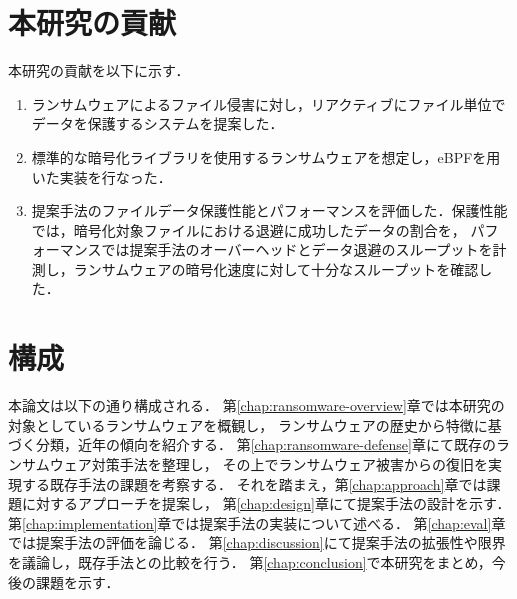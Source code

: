 \section{本研究の貢献}
本研究の貢献を以下に示す．
\begin{enumerate}
  \item ランサムウェアによるファイル侵害に対し，リアクティブにファイル単位でデータを保護するシステムを提案した．


  \item 標準的な暗号化ライブラリを使用するランサムウェアを想定し，eBPFを用いた実装を行なった．

  \item 提案手法のファイルデータ保護性能とパフォーマンスを評価した．保護性能では，暗号化対象ファイルにおける退避に成功したデータの割合を，
        パフォーマンスでは提案手法のオーバーヘッドとデータ退避のスループットを計測し，ランサムウェアの暗号化速度に対して十分なスループットを確認した．
\end{enumerate}

\section{構成}
本論文は以下の通り構成される．
第\ref{chap:ransomware-overview}章では本研究の対象としているランサムウェアを概観し，
ランサムウェアの歴史から特徴に基づく分類，近年の傾向を紹介する．
第\ref{chap:ransomware-defense}章にて既存のランサムウェア対策手法を整理し，
その上でランサムウェア被害からの復旧を実現する既存手法の課題を考察する．
それを踏まえ，第\ref{chap:approach}章では課題に対するアプローチを提案し，
第\ref{chap:design}章にて提案手法の設計を示す．
第\ref{chap:implementation}章では提案手法の実装について述べる．
第\ref{chap:eval}章では提案手法の評価を論じる．
第\ref{chap:discussion}にて提案手法の拡張性や限界を議論し，既存手法との比較を行う．
第\ref{chap:conclusion}で本研究をまとめ，今後の課題を示す．
